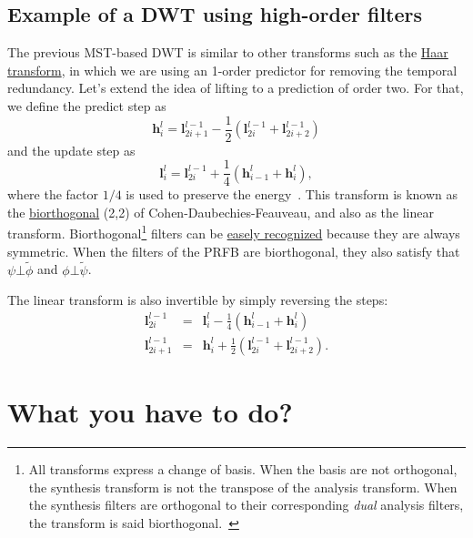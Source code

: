 \subsection{Example of a DWT using high-order filters}
The previous MST-based DWT is similar to other transforms such as the
\href{https://en.wikipedia.org/wiki/Haar_wavelet}{Haar transform}, in
which we are using an 1-order predictor for removing the temporal
redundancy. Let's extend the idea of lifting to a prediction of order
two. For that, we define the predict step as
\begin{equation}
  {\mathbf h}^l_i = {\mathbf l}^{l-1}_{2i+1} - \frac{1}{2}({\mathbf l}^{l-1}_{2i} + {\mathbf l}^{l-1}_{2i+2})
\end{equation}
and the update step as
\begin{equation}
  {\mathbf l}^l_i = {\mathbf l}^{l-1}_{2i} + \frac{1}{4}({\mathbf h}^l_{i-1} + {\mathbf h}^l_i),
\end{equation}
where the factor $1/4$ is used to preserve the
energy~\cite{sweldens1997building}. This transform is known as the
\href{https://en.wikipedia.org/wiki/Biorthogonal_wavelet}{biorthogonal}
(2,2) of Cohen-Daubechies-Feauveau, and also as the linear transform.
Biorthogonal\footnote{All transforms express a change of basis. When
  the basis are not orthogonal, the synthesis transform is not the
  transpose of the analysis transform. When the synthesis filters are
  orthogonal to their corresponding \emph{dual} analysis filters, the
  transform is said biorthogonal.~\cite{vetterli2014foundations}}
filters can be \href{http://wavelets.pybytes.com/}{easely recognized}
because they are always symmetric. When the filters of the PRFB are
biorthogonal, they also satisfy that $\psi\bot\tilde\phi$ and
$\phi\bot\tilde\psi$.

The linear transform is also invertible by simply reversing the steps:
\begin{equation}
  \begin{array}{rcl}
    {\mathbf l}^{l-1}_{2i} & = & {\mathbf l}^l_i - \frac{1}{4}({\mathbf h}^l_{i-1} + {\mathbf h}^l_i)\\
    {\mathbf l}^{l-1}_{2i+1} & = & {\mathbf h}^l_i + \frac{1}{2}({\mathbf l}^{l-1}_{2i} + {\mathbf l}^{l-1}_{2i+2}).
  \end{array}
\end{equation}
  
\section{What you have to do?}

